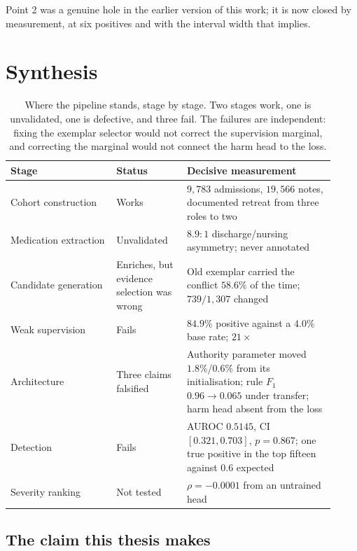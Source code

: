 Point 2 was a genuine hole in the earlier version of this work; it is now closed
by measurement, at six positives and with the interval width that implies.

\section{Synthesis}
\label{sec:synthesis}

\begin{table}[t]
\centering
\small
\begin{tabular}{p{0.3\linewidth}p{0.2\linewidth}p{0.42\linewidth}}
\toprule
\textbf{Stage} & \textbf{Status} & \textbf{Decisive measurement} \\
\midrule
Cohort construction & Works & $9{,}783$ admissions, $19{,}566$ notes, documented
retreat from three roles to two \\
\addlinespace
Medication extraction & Unvalidated & $8.9{:}1$ discharge/nursing asymmetry;
never annotated \\
\addlinespace
Candidate generation & Enriches, but evidence selection was wrong & Old exemplar
carried the conflict $58.6\%$ of the time; $739/1{,}307$ changed \\
\addlinespace
Weak supervision & Fails & $84.9\%$ positive against a $4.0\%$ base rate;
$21\times$ \\
\addlinespace
Architecture & Three claims falsified & Authority parameter moved $1.8\%$/$0.6\%$
from its initialisation; rule $F_1$ $0.96 \to 0.065$ under transfer; harm head
absent from the loss \\
\addlinespace
Detection & Fails & AUROC $0.5145$, CI $[0.321, 0.703]$, $p = 0.867$; one true
positive in the top fifteen against $0.6$ expected \\
\addlinespace
Severity ranking & Not tested & $\rho = -0.0001$ from an untrained head \\
\bottomrule
\end{tabular}
\caption{Where the pipeline stands, stage by stage. Two stages work, one is
unvalidated, one is defective, and three fail. The failures are independent:
fixing the exemplar selector would not correct the supervision marginal, and
correcting the marginal would not connect the harm head to the loss.}
\label{tab:synthesis}
\end{table}

\subsection{The claim this thesis makes}

